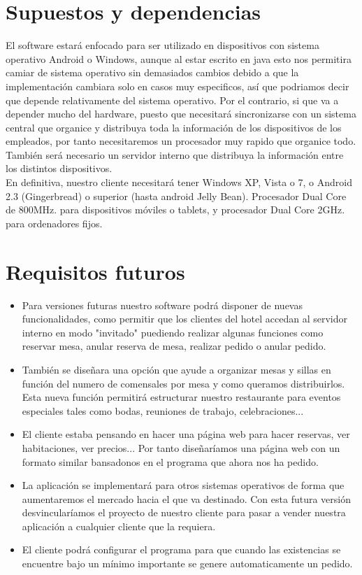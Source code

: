 \documentclass[spanish,a4paper,12pt]{report}	%
\begin{document}
\section{Supuestos y dependencias}	
	El software estará enfocado para ser utilizado en dispositivos con sistema operativo Android o Windows, aunque al estar escrito en java esto nos permitira camiar de sistema operativo sin demasiados cambios debido a que la implementación cambiara solo en casos muy especificos, así que podriamos decir que depende relativamente del sistema operativo.  Por el contrario, si que va a depender mucho del hardware, puesto que necesitará sincronizarse con un sistema central que organice y distribuya toda la información de los dispositivos de los empleados, por tanto necesitaremos un procesador muy rapido que organice todo. También será necesario un servidor interno que distribuya la información entre los distintos dispositivos.	\\

En definitiva,  nuestro cliente necesitará tener Windows XP, Vista o 7, o Android 2.3 (Gingerbread) o superior (hasta android Jelly Bean).
Procesador Dual Core de 800MHz. para dispositivos móviles o tablets, y procesador Dual Core 2GHz. para ordenadores fijos.

\section{Requisitos futuros}
	\begin{itemize}
		\item Para versiones futuras nuestro software podrá disponer de nuevas funcionalidades, como permitir que los clientes del hotel accedan al servidor interno en modo "invitado" puediendo realizar algunas funciones como reservar mesa, anular reserva de mesa, realizar pedido o anular pedido.

		\item También se diseñara una opción que ayude a organizar mesas y sillas en función del numero de comensales por mesa y como queramos distribuirlos. Esta nueva función permitirá estructurar nuestro restaurante para eventos especiales tales como bodas, reuniones de trabajo, celebraciones...

		\item El cliente estaba pensando en hacer una página web para hacer reservas, ver habitaciones, ver precios... Por tanto diseñaríamos una página web con un formato similar bansadonos en el programa que ahora nos ha pedido.

		\item La aplicación se implementará para otros sistemas operativos de forma que aumentaremos el mercado hacia el que va destinado. Con esta futura versión desvincularíamos el proyecto de nuestro cliente para pasar a vender nuestra aplicación a cualquier cliente que la requiera.
		
		\item El cliente podrá configurar el programa para que cuando las existencias se encuentre bajo un mínimo importante se genere automaticamente un pedido.
	\end{itemize}
\end{document}
